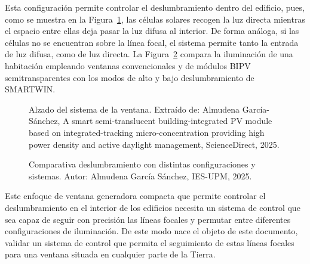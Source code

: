 Esta configuración permite controlar el deslumbramiento dentro del edificio, pues, como se muestra en la Figura~\ref{fig:dayg}, las células solares recogen la luz directa mientras el espacio entre ellas deja pasar la luz difusa al interior. De forma análoga, si las células no se encuentran sobre la línea focal, el sistema permite tanto la entrada de luz difusa, como de luz directa. La Figura~\ref{fig:glarecomp} compara la iluminación de una habitación empleando ventanas convencionales y de módulos BIPV semitransparentes con los modos de alto y bajo deslumbramiento de SMARTWIN.

\begin{figure}
	\centering
	
	\caption{Alzado del sistema de la ventana. Extraído de: Almudena García-Sánchez, A smart semi-translucent building-integrated PV module based on integrated-tracking micro-concentration providing high power density and active daylight management, ScienceDirect, 2025.}
	\label{fig:dayg}
\end{figure}

\begin{figure}[t]
	\centering
	
	
	\caption{Comparativa deslumbramiento con distintas configuraciones y sistemas. Autor: Almudena García Sánchez, IES-UPM, 2025.}
	\label{fig:glarecomp}
\end{figure}

Este enfoque de ventana generadora compacta que permite controlar el deslumbramiento en el interior de los edificios necesita un sistema de control que sea capaz de seguir con precisión las líneas focales y permutar entre diferentes configuraciones de iluminación. De este modo nace el objeto de este documento, validar un sistema de control que permita el seguimiento de estas líneas focales para una ventana situada en cualquier parte de la Tierra.

